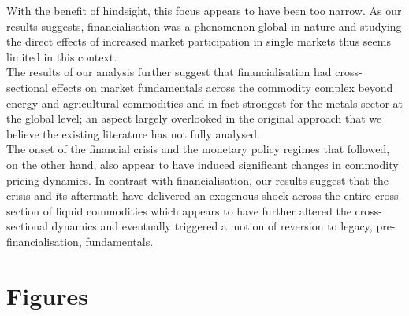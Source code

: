 \documentclass[
  authoryear,
  preprint,
  3p]{elsarticle}
\begin{document}
\medskip

With the benefit of hindsight, this focus appears to have been too
narrow. As our results suggests, financialisation was a phenomenon
global in nature and studying the direct effects of increased market
participation in single markets thus seems limited in this context.\\
The results of our analysis further suggest that financialisation had
cross-sectional effects on market fundamentals across the commodity
complex beyond energy and agricultural commodities and in fact strongest
for the metals sector at the global level; an aspect largely overlooked
in the original approach that we believe the existing literature has not
fully analysed.\\
The onset of the financial crisis and the monetary policy regimes that
followed, on the other hand, also appear to have induced significant
changes in commodity pricing dynamics. In contrast with
financialisation, our results suggest that the crisis and its aftermath
have delivered an exogenous shock across the entire cross-section of
liquid commodities which appears to have further altered the
cross-sectional dynamics and eventually triggered a motion of reversion
to legacy, pre-financialisation, fundamentals.

\newpage


\section*{Figures}\label{figures}
\end{document}
